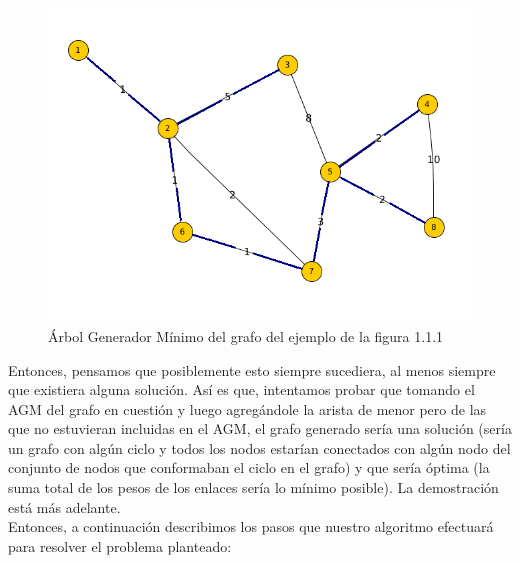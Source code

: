 \documentclass[11pt, a4paper, twoside]{article}
\begin{document}
\begin{figure}[H]
\centering
\includegraphics[scale=1]{imagenes/equipos6.png}
\caption{Árbol Generador Mínimo del grafo del ejemplo de la figura 1.1.1}
\end{figure} 

Entonces, pensamos que posiblemente esto siempre sucediera, al menos siempre
que existiera alguna solución. Así es que,
intentamos probar que tomando el AGM del grafo en cuestión y luego 
agregándole la arista de menor pero de las que no estuvieran incluidas
en el AGM, el grafo generado sería una solución (sería un grafo con algún 
ciclo y todos los nodos estarían conectados con algún nodo del conjunto de 
nodos que conformaban el ciclo en el grafo) y que sería óptima (la suma
total de los pesos de los enlaces sería lo mínimo posible). La demostración
está más adelante. \\
Entonces, a continuación describimos los pasos que nuestro algoritmo
efectuará para resolver el problema planteado:
\end{document}
